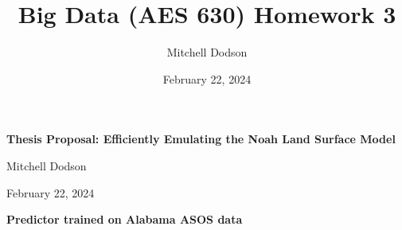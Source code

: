 \documentclass[11pt]{article}
\title{Big Data (AES 630) Homework 3}
\author{Mitchell Dodson}
\date{February 22, 2024}
\begin{document}
\noindent
{\Large\textbf{Thesis Proposal: Efficiently Emulating the Noah Land Surface Model}}

\noindent
\large{Mitchell Dodson}

\noindent
\large{February 22, 2024}

\vspace{1em}
\noindent
{\Large\textbf{Predictor trained on Alabama ASOS data}}
\end{document}
